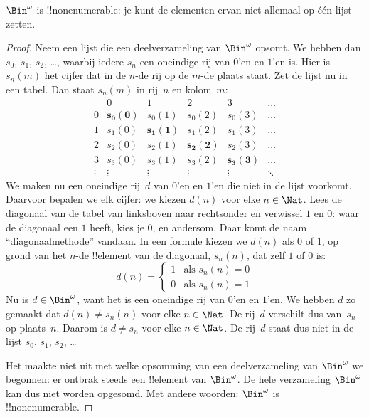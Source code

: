 \documentclass[../../../include/open-logic-section]{subfiles}
\begin{document}
\begin{thm}
$\Bin^\omega$ is !!{nonenumerable}: je kunt de elementen ervan niet
allemaal op één lijst zetten.
\end{thm}

\begin{proof}
Neem een lijst die een deelverzameling van $\Bin^\omega$ opsomt. We
hebben dan $s_{0}$, $s_{1}$, $s_{2}$, \dots{}, waarbij iedere $s_n$ een
oneindige rij van $0$'en en $1$'en is. Hier is $s_n(m)$ het cijfer dat
in de $n$-de rij op de $m$-de plaats staat. Zet de lijst nu in een tabel. Dan staat
$s_n(m)$ in rij~$n$ en kolom~$m$:
\[
\begin{array}{c|c|c|c|c|c}
& 0 & 1 & 2 & 3 & \dots \\\hline
0 & \mathbf{s_{0}(0)} & s_{0}(1) & s_{0}(2) & s_0(3) & \dots \\\hline
1 & s_{1}(0)& \mathbf{s_{1}(1)} & s_1(2) & s_1(3) & \dots \\\hline
2 & s_{2}(0)& s_{2}(1) & \mathbf{s_2(2)} & s_2(3) & \dots \\\hline
3 & s_{3}(0)& s_{3}(1) & s_3(2) & \mathbf{s_3(3)} & \dots \\\hline
\vdots & \vdots & \vdots & \vdots & \vdots & \mathbf{\ddots}
\end{array}
\]
We maken nu een oneindige rij~$d$ van $0$'en en $1$'en die niet in de
lijst voorkomt. Daarvoor bepalen we elk cijfer: we kiezen
$d(n)$ voor elke $n \in \Nat$. Lees de diagonaal van de tabel van
linksboven naar rechtsonder en verwissel $1$ en $0$: waar de diagonaal
een $1$ heeft, kies je $0$, en andersom. Daar komt de naam
``diagonaalmethode'' vandaan. In een formule kiezen we $d(n)$ als $0$
of $1$, op grond van het $n$-de !!{element} van de diagonaal, $s_n(n)$,
dat zelf $1$ of $0$ is:
\[
d(n) =
\begin{cases}
1 & \text{als $s_{n}(n) = 0$}\\
0 & \text{als $s_{n}(n) = 1$}
\end{cases}
\]
Nu is $d \in \Bin^\omega$, want het is een oneindige rij van $0$'en en
$1$'en. We hebben $d$ zo gemaakt dat $d(n) \neq s_n(n)$ voor elke
$n \in \Nat$. De rij~$d$ verschilt dus van~$s_n$ op plaats~$n$.
Daarom is $d \neq s_n$ voor elke $n\in \Nat$. De rij~$d$ staat dus
niet in de lijst $s_0$, $s_1$, $s_2$, \dots

Het maakte niet uit met welke opsomming van een deelverzameling van
$\Bin^\omega$ we begonnen: er ontbrak steeds een !!{element} van
$\Bin^\omega$. De hele verzameling $\Bin^\omega$ kan dus niet worden
opgesomd. Met andere woorden: $\Bin^\omega$ is !!{nonenumerable}.
\end{proof}
\end{document}
